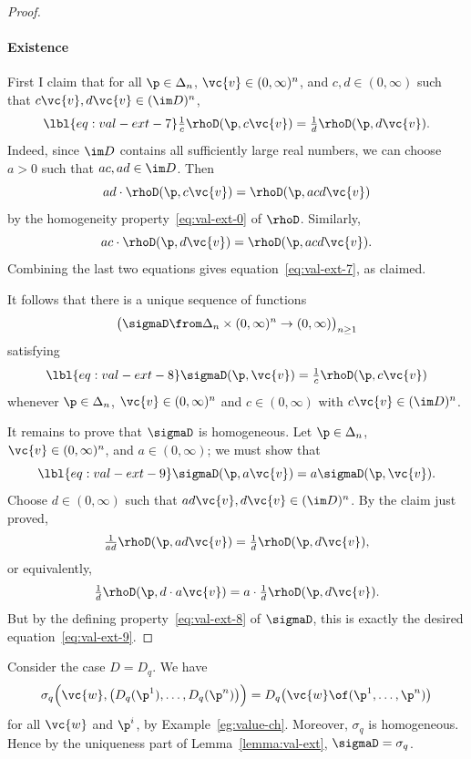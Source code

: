 \begin{proof}
\paragraph*{Existence}
First I claim that for all $\p \in \Delta_n$, $\vc{v} \in (0, \infty)^n$,
and $c, d \in (0, \infty)$ such that $c\vc{v}, d\vc{v} \in (\im D)^n$, 
% 
\begin{equation}
\lbl{eq:val-ext-7}
\tfrac{1}{c} \rhoD(\p, c\vc{v})
=
\tfrac{1}{d} \rhoD(\p, d\vc{v}).
\end{equation}
% 
Indeed, since $\im D$ contains all sufficiently large real numbers, we can
choose $a > 0$ such that $ac, ad \in \im D$.  Then
\[
ad \cdot \rhoD(\p, c\vc{v})
=
\rhoD(\p, acd\vc{v})
\]
by the homogeneity property~\eqref{eq:val-ext-0} of $\rhoD$.  Similarly, 
\[
ac \cdot \rhoD(\p, d\vc{v})
=
\rhoD(\p, acd\vc{v}).
\]
Combining the last two equations gives equation~\eqref{eq:val-ext-7}, as
claimed. 

It follows that there is a unique sequence of functions 
\[
\bigl( 
\sigmaD \from \Delta_n \times (0, \infty)^n \to (0, \infty) 
\bigr)_{n \geq 1}
\]
satisfying
% 
\begin{equation}
\lbl{eq:val-ext-8}
\sigmaD(\p, \vc{v}) = \tfrac{1}{c} \rhoD(\p, c\vc{v})
\end{equation}
% 
whenever $\p \in \Delta_n$, $\vc{v} \in (0, \infty)^n$ and $c \in (0,
\infty)$ with $c\vc{v} \in (\im D)^n$.  

It remains to prove that $\sigmaD$ is homogeneous.  Let $\p \in \Delta_n$,
$\vc{v} \in (0, \infty)^n$, and $a \in (0, \infty)$; we must show that
% 
\begin{equation}
\lbl{eq:val-ext-9}
\sigmaD(\p, a\vc{v}) = a \sigmaD(\p, \vc{v}).
\end{equation}
% 
Choose $d \in (0, \infty)$ such that $ad\vc{v}, d\vc{v} \in (\im D)^n$.  By
the claim just proved,
\[
\tfrac{1}{ad} \rhoD(\p, ad\vc{v})
=
\tfrac{1}{d} \rhoD(\p, d\vc{v}),
\]
or equivalently,
\[
\tfrac{1}{d} \rhoD(\p, d \cdot a\vc{v})
=
a \cdot \tfrac{1}{d} \rhoD(\p, d\vc{v}).
\]
But by the defining property~\eqref{eq:val-ext-8} of $\sigmaD$, this is
exactly the desired equation~\eqref{eq:val-ext-9}.
\end{proof}

\begin{example}
Consider the case $D = D_q$.  We have
\[
\sigma_q\Bigl( 
\vc{w}, \bigl( D_q(\p^1), \ldots, D_q(\p^n) \bigr) 
\Bigr)
=
D_q\bigl( \vc{w} \of (\p^1, \ldots, \p^n) \bigr)
\]
for all $\vc{w}$ and $\p^i$, by Example~\ref{eg:value-ch}.  Moreover,
$\sigma_q$ is homogeneous.  Hence by the uniqueness part of
Lemma~\ref{lemma:val-ext}, $\sigmaD = \sigma_q$.
\end{example}

